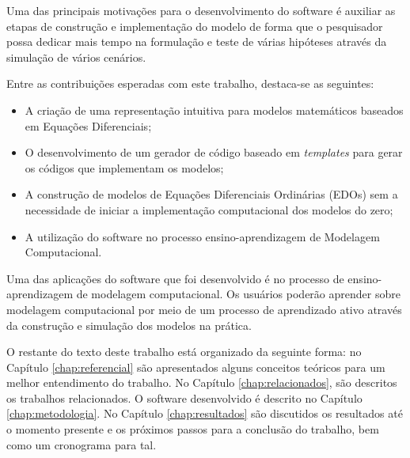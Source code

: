 \documentclass[
	12pt,				%
	openright,			%
	oneside,			%
	a4paper,			%
	main=brazil,
	english,			%
	]{ufsj-abntex2}
\begin{document}
Uma das principais motivações para o desenvolvimento do software é auxiliar as etapas de construção e implementação do modelo de forma que o pesquisador possa dedicar mais tempo na formulação e teste de várias hipóteses através da simulação de vários cenários. 

Entre as contribuições esperadas com este trabalho, destaca-se as seguintes: 
\begin{itemize}
    \item A criação de uma representação intuitiva para modelos matemáticos baseados em Equações Diferenciais; 
    \item O desenvolvimento de um gerador de código baseado em \textit{templates} para gerar os códigos que implementam os modelos; 
    \item A construção de modelos de Equações Diferenciais Ordinárias (EDOs) sem a necessidade de iniciar a implementação computacional dos modelos do zero; 
    \item A utilização do software no processo ensino-aprendizagem de Modelagem Computacional. 
\end{itemize}

Uma das aplicações do software que foi desenvolvido é no processo de ensino-aprendizagem de modelagem computacional. Os usuários poderão aprender sobre modelagem computacional por meio de um processo de aprendizado ativo através da construção e simulação dos modelos na prática.  

O restante do texto deste trabalho está organizado da seguinte forma: no Capítulo \ref{chap:referencial} são apresentados alguns conceitos teóricos para um melhor entendimento do trabalho. No Capítulo \ref{chap:relacionados}, são descritos os trabalhos relacionados. O software desenvolvido é descrito no Capítulo \ref{chap:metodologia}. No Capítulo \ref{chap:resultados} são discutidos os resultados até o momento presente e os próximos passos para a conclusão do trabalho, bem como um cronograma para tal.




\end{document}
